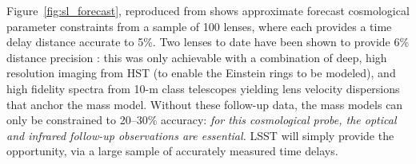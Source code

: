 Figure~\ref{fig:sl_forecast}, reproduced from \citet{Coe+Moustakas2009}
shows approximate forecast cosmological  parameter constraints from a
sample of 100 lenses, where each provides a  time delay distance
accurate to 5\%. Two lenses to date have been  shown to provide 6\%
distance precision \citep{SuyuEtal2014}: this was only  achievable with a
combination of deep, high resolution imaging from HST (to enable the
Einstein rings to be modeled), and high fidelity spectra from 10-m class
telescopes yielding lens velocity dispersions that anchor the mass
model. Without these follow-up data, the mass models can only be
constrained to 20--30\% accuracy: {\it for this cosmological probe, the
optical and infrared follow-up observations are essential.} LSST will
simply provide the opportunity, via a large sample of accurately
measured time delays.

